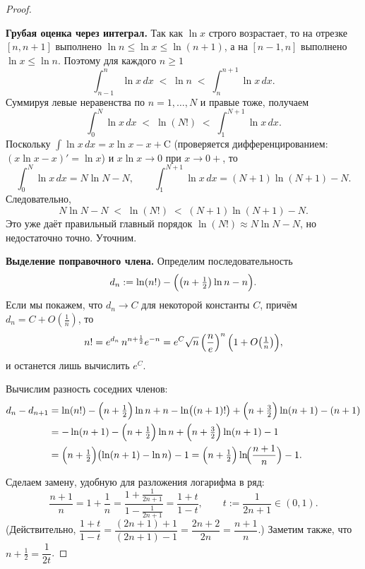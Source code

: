 \begin{proof}
\begin{center}
	\end{center}

	\textbf{Грубая оценка через интеграл.}
	Так как $\ln x$ строго возрастает, то на отрезке $[n,n+1]$ выполнено
	$\ln n\le \ln x\le \ln(n+1)$, а на $[n-1,n]$ выполнено $\ln x\le \ln n$.
	Поэтому для каждого $n\ge1$
	\[
	\int_{n-1}^{n}\ln x\,dx \;<\; \ln n \;<\; \int_{n}^{n+1}\ln x\,dx .
	\]
	Суммируя левые неравенства по $n=1,\dots,N$ и правые тоже, получаем
	\[
	\int_{0}^{N}\ln x\,dx \;<\; \ln(N!) \;<\; \int_{1}^{N+1}\ln x\,dx .
	\]
	Поскольку $\int \ln x\,dx = x\ln x - x + \mathrm{C}$ (проверяется
	дифференцированием: $(x\ln x-x)'=\ln x$) и $x\ln x\to0$ при $x\to0+$, то
	\[
	\int_{0}^{N}\ln x\,dx = N\ln N-N,
	\qquad
	\int_{1}^{N+1}\ln x\,dx = (N+1)\ln(N+1)-N.
	\]
	Следовательно,
	\[
	N\ln N - N \;<\; \ln(N!) \;<\; (N+1)\ln(N+1) - N .
	\]
	Это уже даёт правильный главный порядок $\ln(N!)\approx N\ln N-N$, но
	недостаточно точно. Уточним.

	\medskip
	\textbf{Выделение поправочного члена.}
	Определим последовательность
	\[
	d_n := \ln(n!) - \Bigl(\bigl(n+\tfrac12\bigr)\ln n - n\Bigr).
	\]
	Если мы покажем, что $d_n\to C$ для некоторой константы $C$, причём
	$d_n=C+O\!\left(\tfrac1n\right)$, то
	\[
	n! = e^{d_n}\, n^{n+\frac12}e^{-n}
	= e^{C}\sqrt{n}\left(\frac{n}{e}\right)^n\Bigl(1+O\!\left(\tfrac1n\right)\Bigr),
	\]
	и останется лишь вычислить $e^{C}$.

	Вычислим разность соседних членов:
	\begin{align*}
		d_n-d_{n+1}
		&= \ln(n!) - \Bigl(n+\tfrac12\Bigr)\ln n + n
		- \ln\bigl((n+1)!\bigr) + \Bigl(n+\tfrac32\Bigr)\ln(n+1) - (n+1) \\
		&= -\ln(n+1)
		- \Bigl(n+\tfrac12\Bigr)\ln n
		+ \Bigl(n+\tfrac32\Bigr)\ln(n+1) - 1 \\
		&= \Bigl(n+\tfrac12\Bigr)\bigl(\ln(n+1)-\ln n\bigr)-1
		= \Bigl(n+\tfrac12\Bigr)\ln\!\Bigl(\frac{n+1}{n}\Bigr)-1.
	\end{align*}

	Сделаем замену, удобную для разложения логарифма в ряд:
	\[
	\frac{n+1}{n}=1+\frac1n
	= \frac{1+\frac1{2n+1}}{1-\frac1{2n+1}}
	= \frac{1+t}{1-t},
	\qquad t:=\frac{1}{2n+1}\in(0,1).
	\]
	(Действительно, $\dfrac{1+t}{1-t}=\dfrac{(2n+1)+1}{(2n+1)-1}=\dfrac{2n+2}{2n}=\dfrac{n+1}{n}$.)
	Заметим также, что $n+\tfrac12=\dfrac{1}{2t}$.


\end{proof}
